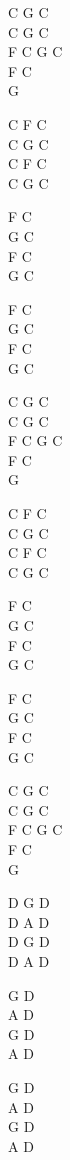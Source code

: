 \begin{chord}
    C G C\\
    C G C\\
    F C G C\\
    F C\\
    G

    C F C\\
    C G C\\
    C F C\\
    C G C

    F C\\
    G C\\
    F C\\
    G C

    F C\\
    G C\\
    F C\\
    G C

    C G C\\
    C G C\\
    F C G C\\
    F C\\
    G

    C F C\\
    C G C\\
    C F C\\
    C G C

    F C\\
    G C\\
    F C\\
    G C

    F C\\
    G C\\
    F C\\
    G C
	
	C G C\\
    C G C\\
    F C G C\\
    F C\\
    G

    D G D\\
    D A D\\
    D G D\\
    D A D

    G D\\
    A D\\
    G D\\
    A D

    G D\\
    A D\\
    G D\\
    A D
\end{chord}